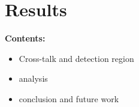 \chapter{Results} %
\noindent\textbf{\large Contents:}

\noindent\hrulefill
\noindent\startcontents[chapters]
\noindent{}
\noindent\hrulefill
\label{Chapter4}

\begin{itemize}
    \item Cross-talk and detection region
    \item analysis
    \item conclusion and future work
\end{itemize}
